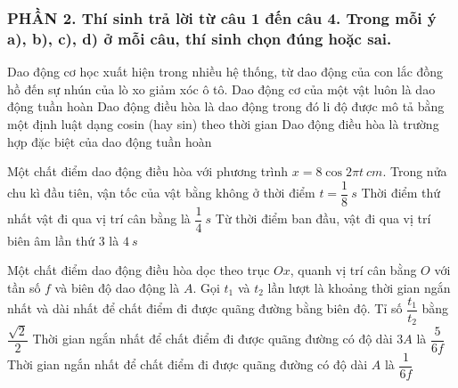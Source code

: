 \subsubsection*{PHẦN 2. Thí sinh trả lời từ câu 1 đến câu 4. Trong mỗi ý a), b), c), d) ở mỗi câu, thí sinh chọn đúng hoặc sai.}
\setcounter{ex}{0}
\begin{ex}
	Dao động cơ học xuất hiện trong nhiều hệ thống, từ dao động của con lắc đồng hồ đến sự nhún của lò xo giảm xóc ô tô.
	{Dao động cơ của một vật luôn là dao động tuần hoàn}
	{\True Dao động điều hòa là dao động trong đó li độ được mô tả bằng một định luật dạng cosin (hay sin) theo thời gian}
	{\True Dao động điều hòa là trường hợp đặc biệt của dao động tuần hoàn}
\end{ex}
\begin{ex}
	Một chất điểm dao động điều hòa với phương trình $x=8 \cos 2 \pi t\ cm$.
	{Trong nửa chu kì đầu tiên, vận tốc của vật bằng không ở thời điểm $t=\dfrac{1}{8} \ s$}
	{\True Thời điểm thứ nhất vật đi qua vị trí cân bằng là $\dfrac{1}{4} \ s$}
	{Từ thời điểm ban đầu, vật đi qua vị trí biên âm lần thứ $3$ là $4 \ s$}
\end{ex}
\begin{ex}
	Một chất điểm dao động điều hòa dọc theo trục $O x$, quanh vị trí cân bằng $O$ với tần số $f$ và biên độ dao động là $A$.
	{Gọi $t_1$ và $t_2$ lần lượt là khoảng thời gian ngắn nhất và dài nhất để chất điểm đi được quãng đường bằng biên độ. Tỉ số $\dfrac{t_1}{t_2}$ bằng $\dfrac{\sqrt{2}}{2}$}
	{Thời gian ngắn nhất để chất điểm đi được quãng đường có độ dài $3A$ là $\dfrac{5}{6 f}$}
	{\True Thời gian ngắn nhất để chất điểm đi được quãng đường có độ dài $A$ là $\dfrac{1}{6 f}$}
\end{ex}
